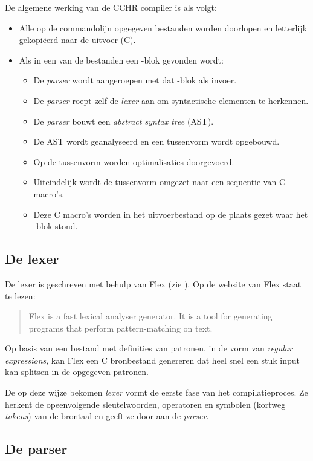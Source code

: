 De algemene werking van de CCHR compiler is als volgt: \begin{itemize}
  \item Alle op de commandolijn opgegeven bestanden worden doorlopen en letterlijk gekopi\"eerd naar de uitvoer (C).
  \item Als in een van de bestanden een -blok gevonden wordt: \begin{itemize}
    \item De {\em parser} wordt aangeroepen met dat -blok als invoer.
    \item De {\em parser} roept zelf de {\em lexer} aan om syntactische elementen te herkennen.
    \item De {\em parser} bouwt een {\em abstract syntax tree} (AST).
    \item De AST wordt geanalyseerd en een tussenvorm wordt opgebouwd.
    \item Op de tussenvorm worden optimalisaties doorgevoerd.
    \item Uiteindelijk wordt de tussenvorm omgezet naar een sequentie van C macro's.
    \item Deze C macro's worden in het uitvoerbestand op de plaats gezet waar het -blok stond.
  \end{itemize}
\end{itemize}

\subsection{De lexer} \label{sec:lexer}

De lexer is geschreven met behulp van Flex (zie \cite{flex}). Op de website van Flex staat te lezen: \begin{quote}
  Flex is a fast lexical analyser generator. It is a tool for generating programs that perform pattern-matching on text.
\end{quote}

Op basis van een bestand met definities van patronen, in de vorm van {\em regular expressions}, kan Flex een C bronbestand genereren dat heel snel een stuk input kan splitsen in de opgegeven patronen. 

De op deze wijze bekomen {\em lexer} vormt de eerste fase van het compilatieproces. Ze herkent de opeenvolgende sleutelwoorden, operatoren en symbolen (kortweg {\em tokens}) van de brontaal en geeft ze door aan de {\em parser}.

\subsection{De parser} \label{sec:parser}

